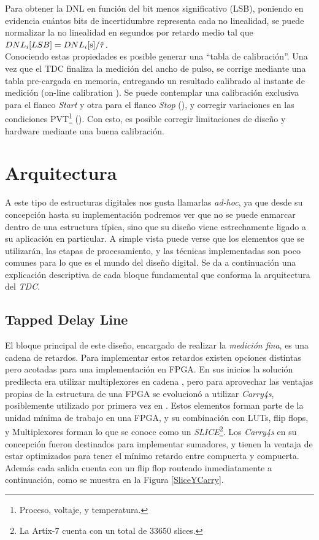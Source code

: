 Para obtener la DNL en función del bit menos significativo (LSB), poniendo 
en evidencia cuántos bits de incertidumbre representa cada no linealidad, 
se puede normalizar la no linealidad en segundos por retardo medio tal que $DNL_i[LSB] = DNL_i[\rm{s}] / \hat{\tau}$.\\
Conociendo estas propiedades es posible generar una ``tabla de calibración''. Una vez que el TDC
finaliza la medición del ancho de pulso, se corrige mediante una tabla pre-cargada en memoria, entregando un resultado
calibrado al instante de medición (on-line calibration \cite{Liu2015}). Se puede contemplar
una calibración exclusiva para el flanco \textit{Start} y otra para el flanco \textit{Stop} (\cite{Khaddour2023}), y 
corregir variaciones en las condiciones PVT\footnote{Proceso, voltaje, y temperatura.} (\cite{Qin2017}).
Con esto, es posible corregir limitaciones de diseño y hardware mediante una buena calibración.\\

\section{Arquitectura}

A este tipo de estructuras digitales nos gusta llamarlas \textit{ad-hoc}, ya que desde su concepción hasta su
implementación podremos ver que no se puede enmarcar dentro de una estructura típica, sino que su diseño viene estrechamente ligado
a su aplicación en particular. A simple vista puede verse que los elementos que se utilizarán, las etapas de procesamiento,
y las técnicas implementadas son poco comunes para lo que es el mundo del diseño digital. Se da a continuación 
una explicación descriptiva de cada bloque fundamental que conforma la arquitectura del \textit{TDC}.

\subsection{Tapped Delay Line}
El bloque principal de este diseño, encargado de realizar la \textit{medición fina}, es una cadena de retardos.
Para implementar estos retardos existen opciones distintas pero acotadas para una implementación en FPGA. En sus
inicios la solución predilecta era utilizar multiplexores en cadena \cite{kalisz_field-programmable-gate-array-based_1997},
pero para aprovechar las ventajas propias de la estructura de una FPGA se evolucionó a utilizar
\textit{Carry4s}, posiblemente utilizado por primera vez en \cite{favi_17ps_2009}. Estos elementos
forman parte de la unidad mínima de trabajo en una FPGA, y su combinación con LUTs, flip flops, y Multiplexores forman lo que 
se conoce como un \textit{SLICE}\footnote[1]{La Artix-7 cuenta con un total de 33650 slices.}. 
Los \textit{Carry4s} en su concepción fueron destinados para implementar sumadores, y tienen la ventaja de estar optimizados
para tener el mínimo retardo entre compuerta y compuerta. Además cada salida cuenta con un flip flop routeado inmediatamente
a continuación, como se muestra en la Figura \ref{SliceYCarry}.

